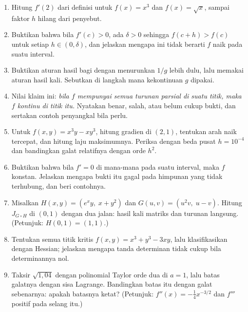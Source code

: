 \begin{latihan}
\begin{enumerate}
  \item Hitung $f'(2)$ dari definisi untuk $f(x)=x^{3}$ dan $f(x)=\sqrt{x}$, sampai faktor
        $h$ hilang dari penyebut.

  \item Buktikan bahwa bila $f'(c)>0$, ada $\delta>0$ sehingga $f(c+h)>f(c)$ untuk setiap
        $h\in(0,\delta)$, dan jelaskan mengapa ini tidak berarti $f$ naik pada suatu interval.

  \item Buktikan aturan hasil bagi dengan menurunkan $1/g$ lebih dulu, lalu memakai aturan
        hasil kali. Sebutkan di langkah mana kekontinuan $g$ dipakai.

  \item Nilai klaim ini: \emph{bila $f$ mempunyai semua turunan parsial di suatu titik, maka
        $f$ kontinu di titik itu.} Nyatakan benar, salah, atau belum cukup bukti, dan
        sertakan contoh penyangkal bila perlu.

  \item Untuk $f(x,y)=x^{3}y-xy^{3}$, hitung gradien di $(2,1)$, tentukan arah naik tercepat,
        dan hitung laju maksimumnya. Periksa dengan beda pusat $h=10^{-4}$ dan bandingkan
        galat relatifnya dengan orde $h^{2}$.

  \item Buktikan bahwa bila $f'=0$ di mana-mana pada suatu interval, maka $f$ konstan.
        Jelaskan mengapa bukti itu gagal pada himpunan yang tidak terhubung, dan beri
        contohnya.

  \item Misalkan $H(x,y)=(e^{x}y,\;x+y^{2})$ dan $G(u,v)=(u^{2}v,\;u-v)$. Hitung
        $J_{G\circ H}$ di $(0,1)$ dengan dua jalan: hasil kali matriks dan turunan langsung.
        (Petunjuk: $H(0,1)=(1,1)$.)

  \item Tentukan semua titik kritis $f(x,y)=x^{3}+y^{3}-3xy$, lalu klasifikasikan dengan
        Hessian; jelaskan mengapa tanda determinan tidak cukup bila determinannya nol.

  \item Taksir $\sqrt{1{,}04}$ dengan polinomial Taylor orde dua di $a=1$, lalu batas
        galatnya dengan sisa Lagrange. Bandingkan batas itu dengan galat sebenarnya: apakah batasnya ketat? (Petunjuk:
        $f''(x)=-\frac14x^{-3/2}$ dan $f'''$ positif pada selang itu.)
\end{enumerate}
\end{latihan}

